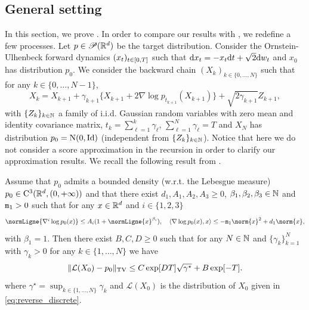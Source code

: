 \subsection{General setting}
\label{sec:main-content}

In this section, we prove . In order to compare our
results with \cite[Theorem 1]{debortoli2021diffusion}, we redefine a few
processes.  Let $p \in \mathscr{P}(\mathbb{R}^d)$ be the target distribution. Consider the
Ornstein-Ulhenbeck forward dynamics $(x_t)_{t \in \left[0,T\right]}$ such that
$\mathrm{d} x_t = -x_t \mathrm{d} t + \sqrt{2} \mathrm{d} w_t$ and $x_0$ has distribution
$p_0$. We consider the backward chain $(X_k)_{k \in \{0, \dots, N\}}$ such that
for any $k \in \{0, \dots, N-1\}$,
\begin{equation}
  \label{eq:reverse_discrete}
  X_k = X_{k+1} + \gamma_{k+1} \{ X_{k+1} + 2 \nabla \log p_{t_{k+1}}(X_{k+1}) \} + \sqrt{2 \gamma_{k+1}} Z_{k+1}  ,
\end{equation}
with $\{Z_k\}_{k \in \mathbb{N}}$ a family of i.i.d. Gaussian random variables with
zero mean and identity covariance matrix, $t_{k} = \sum_{\ell=1}^k \gamma_{\ell}$,
$\sum_{\ell=1}^{N} \gamma_{\ell} = T$ and $X_N$ has distribution
$p_0 = \mathrm{N}(0, \operatorname{Id})$ (independent from $\{Z_k\}_{k \in \mathbb{N}}$). Notice
that here we do not consider a score approximation in the recursion in order to
clarify our approximation results. We recall the following result from
\cite[Theorem 1]{debortoli2021diffusion}.

\begin{theorem}
  Assume that $p_0$ admits a bounded density (w.r.t. the Lebesgue measure)
  $p_0 \in \mathrm{C}^3(\mathbb{R}^d, \left(0, +\infty\right))$  and that there
  exist $d_1, A_1, A_2, A_3 \geq 0$, $\beta_1, \beta_2, \beta_3 \in \mathbb{N}$ and
  $\mathtt{m}_1 > 0$ such that for any $x \in \mathbb{R}^d$ and $i \in \{1, 2, 3\}$
            \begin{equation}
              \textstyle{
              \normLigne{\nabla^i \log p_0(x)} \leq A_i(1 + \normLigne{x}^{\beta_i}) , \quad \langle \nabla \log p_0(x), x \rangle \leq -\mtt_1 \norm{x}^2 + d_1 \norm{x} ,}
          \end{equation}
          with $\beta_1 = 1$.  Then  there exist
          $B, C, D \geq0$ such that for any $N \in \mathbb{N}$
          and $\{\gamma_k\}_{k=1}^N$ with $\gamma_k > 0$ for any
          $k \in \{1, \dots, N\}$ we have 
          \begin{equation}
            \label{eq:ineq_thm_1}
 \| \mathcal{L}(X_0)-p_0 \|_{\mathrm{TV}} \leq   C \exp[D T] \sqrt{\gamma^\star} + B \exp[-T]  .          
          \end{equation}
          where $\gamma^\star = \sup_{k \in \{1, \dots, N\}} \gamma_k$ and
          $\mathcal{L}(X_0)$ is the distribution of $X_0$ given in \eqref{eq:reverse_discrete}.
        \end{theorem}

